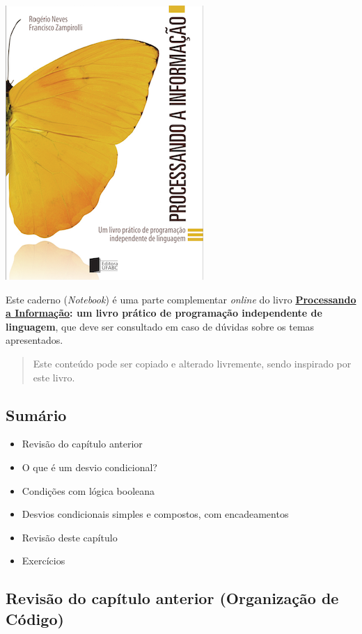 \documentclass[12pt,a4paper]{article}
\providecommand{\tightlist}{%
      \setlength{\itemsep}{0pt}\setlength{\parskip}{0pt}}
\begin{document}
    \includegraphics{"figs/Capa_Processando_Informacao.jpg"}

Este caderno (\emph{Notebook}) é uma parte complementar \emph{online} do
livro
\textbf{\href{https://editora.ufabc.edu.br/matematica-e-ciencias-da-computacao/58-processando-a-informacao}{Processando
a Informação}: um livro prático de programação independente de
linguagem}, que deve ser consultado em caso de dúvidas sobre os temas
apresentados.

\begin{quote}
Este conteúdo pode ser copiado e alterado livremente, sendo inspirado
por este livro.
\end{quote}

    \hypertarget{sumuxe1rio}{%
\subsection{Sumário}\label{sumuxe1rio}}

\begin{itemize}
\tightlist
\item
  Revisão do capítulo anterior
\item
  O que é um desvio condicional?
\item
  Condições com lógica booleana
\item
  Desvios condicionais simples e compostos, com encadeamentos
\item
  Revisão deste capítulo
\item
  Exercícios
\end{itemize}

    \hypertarget{revisuxe3o-do-capuxedtulo-anterior-organizauxe7uxe3o-de-cuxf3digo}{%
\subsection{Revisão do capítulo anterior (Organização de
Código)}\label{revisuxe3o-do-capuxedtulo-anterior-organizauxe7uxe3o-de-cuxf3digo}}
\end{document}
